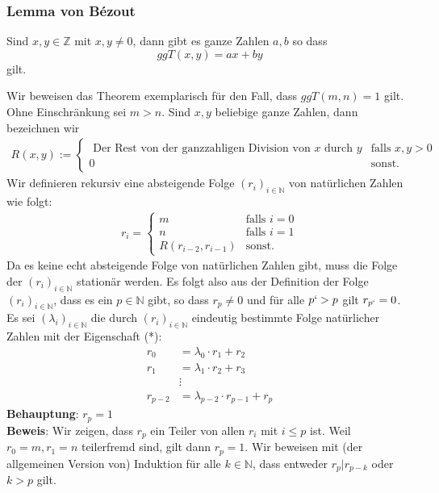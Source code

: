 \subsubsection{Lemma von Bézout}

Sind $x,y\in\mathbb{Z}$ mit $x,y\neq 0$, dann gibt es ganze Zahlen $a,b$ so dass
\[
	ggT(x,y)=ax+by
\]
gilt.

Wir beweisen das Theorem exemplarisch für den Fall, dass $ggT(m,n)=1$ gilt. Ohne Einschränkung sei $m>n$. Sind $x,y$ beliebige ganze Zahlen, dann bezeichnen wir
\begin{align*}
	R(x,y):=\begin{cases}
		\text{ Der Rest von der ganzzahligen Division von $x$ durch $y$} & \text{falls }x,y>0 \\
		0                                                                & \text{sonst.}
	\end{cases}
\end{align*}
Wir definieren rekursiv eine absteigende Folge $(r_i)_{i\in\mathbb{N}}$ von natürlichen Zahlen wie folgt:
\begin{align*}
	r_i=\begin{cases}
		m                  & \text{falls }i=0 \\
		n                  & \text{falls }i=1 \\
		R(r_{i-2},r_{i-1}) & \text{sonst.}
	\end{cases}
\end{align*}
Da es keine echt absteigende Folge von natürlichen Zahlen gibt, muss die Folge der $(r_i)_{i\in\mathbb{N}}$ stationär werden. Es folgt also aus der Definition der Folge $(r_i)_{i\in\mathbb{N}}$, dass es ein $p\in\mathbb{N}$ gibt, so dass $r_{p}\neq0$ und für alle $p`>p$ gilt $r_{p`}=0$. Es sei $(\lambda_i)_{i\in\mathbb{N}}$ die durch $(r_i)_{i\in\mathbb{N}}$ eindeutig bestimmte Folge natürlicher Zahlen mit der Eigenschaft (*):
\begin{align*}
	r_0     & =\lambda_0\cdot r_1+r_2           \\
	r_1     & =\lambda_1\cdot r_2+r_3           \\
	        & \vdots                            \\
	r_{p-2} & =\lambda_{p-2}\cdot r_{p-1}+r_{p}
\end{align*}
\textbf{Behauptung}: $r_p=1$\\
\textbf{Beweis}: Wir zeigen, dass $r_p$ ein Teiler von allen $r_i$ mit $i\leq p$ ist. Weil $r_0=m,r_1=n$ teilerfremd sind, gilt dann $r_p=1$. Wir beweisen mit (der allgemeinen Version von) Induktion für alle $k\in\mathbb{N}$, dass entweder $r_p|r_{p-k}$ oder $k>p$ gilt.
